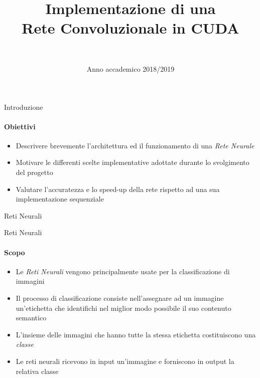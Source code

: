 \documentclass[
 ]{beamer}
\author {
            \texorpdfstring{\hspace*{0.01em}{\Large Michele Valsesia}}{Michele Valsesia} 
            \texorpdfstring{\\ \bigskip}{e}
            \texorpdfstring{\hspace*{0.3em}{\Large Nicholas Aspes }}{Nicholas Aspes}
        }
\begin{document}

\title{Implementazione di una \\ 
       Rete Convoluzionale in CUDA \bigskip}
        
\date{\Large Anno accademico 2018/2019}


     
\begin{frame}
\maketitle
\end{frame}



\begin{frame}{Introduzione}
    \framesubtitle{Obiettivi}  
    
    \begin{itemize} [<+->]
        \setlength\itemsep{3em}
        \item \large Descrivere brevemente l'architettura ed il funzionamento di una \emph{Rete Neurale}
        \item \large Motivare le differenti scelte implementative adottate durante lo svolgimento del progetto
        \item \large Valutare l'accuratezza e lo speed-up della rete rispetto ad una sua implementazione sequenziale       
    \end{itemize}  
\end{frame}



\begin{frame}[c]
  \centering
  \bigskip \bigskip    
  \Huge Reti Neurali
\end{frame}

\begin{frame}{Reti Neurali}
    \framesubtitle{Scopo}
    \begin{itemize} [<+->]
        \setlength\itemsep{2em}
        \item \large Le \emph{Reti Neurali} vengono principalmente usate per la classificazione di immagini
       \item \large Il processo di classificazione consiste nell'assegnare ad un immagine un'etichetta che identifichi nel miglior modo possibile il suo contenuto semantico
       \item \large L'insieme delle immagini che hanno tutte la stessa etichetta costituiscono una \emph{classe}
       \item \large Le reti neurali ricevono in input un'immagine e forniscono in output la relativa classe 
    \end{itemize}
\end{frame} 
\end{document}
